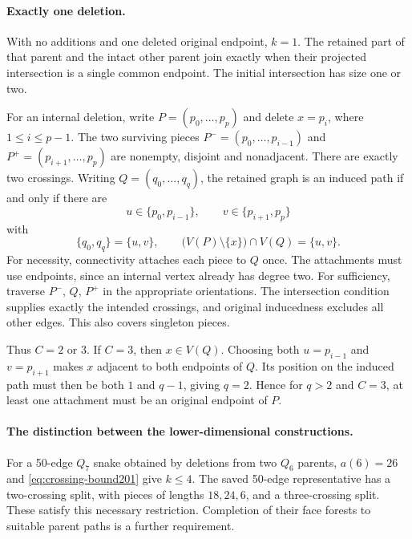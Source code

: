 \documentclass[11pt,a4paper]{article}
\theoremstyle{definition}
\theoremstyle{remark}
\begin{document}
\paragraph{Exactly one deletion.}
With no additions and one deleted original endpoint, $k=1$.
The retained part of that parent and the intact other parent join
exactly when their projected intersection is a single common endpoint.
The initial intersection has size one or two.

For an internal deletion, write $P=(p_0,\ldots,p_p)$ and delete
$x=p_i$, where $1\le i\le p-1$. The two surviving pieces
$P^-=(p_0,\ldots,p_{i-1})$ and $P^+=(p_{i+1},\ldots,p_p)$ are
nonempty, disjoint and nonadjacent. There are exactly two crossings.
Writing $Q=(q_0,\ldots,q_q)$, the retained graph is an induced path
if and only if there are
\[
u\in\{p_0,p_{i-1}\},\qquad v\in\{p_{i+1},p_p\}
\]
with
\begin{equation}\label{eq:one-deletion201}
\{q_0,q_q\}=\{u,v\},\qquad
\bigl(V(P)\setminus\{x\}\bigr)\cap V(Q)=\{u,v\}.
\end{equation}
For necessity, connectivity attaches each piece to $Q$ once.
The attachments must use endpoints, since an internal vertex already
has degree two. For sufficiency, traverse $P^-$, $Q$, $P^+$ in the
appropriate orientations. The intersection condition supplies exactly
the intended crossings, and original inducedness excludes all other
edges. This also covers singleton pieces.

Thus $C=2$ or $3$. If $C=3$, then $x\in V(Q)$. Choosing both
$u=p_{i-1}$ and $v=p_{i+1}$ makes $x$ adjacent to both endpoints
of $Q$. Its position on the induced path must then be both $1$ and
$q-1$, giving $q=2$. Hence for $q>2$ and $C=3$, at least one
attachment must be an original endpoint of $P$.

\paragraph{The distinction between the lower-dimensional constructions.}
For a 50-edge $Q_7$ snake obtained by deletions from two $Q_6$ parents,
$a(6)=26$ and \eqref{eq:crossing-bound201} give $k\le4$.
The saved 50-edge representative has a two-crossing split, with pieces
of lengths $18,24,6$, and a three-crossing split. These satisfy this
necessary restriction. Completion of their face forests to suitable
parent paths is a further requirement.
\end{document}
